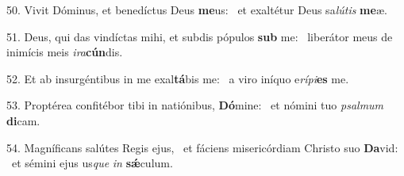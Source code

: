 50. Vivit Dóminus, et benedíctus Deus \textbf{me}us: \ast\  et exaltétur Deus sa\textit{lú}\textit{tis} \textbf{me}æ.\

51. Deus, qui das vindíctas mihi, et subdis pópulos \textbf{sub} me: \ast\  liberátor meus de inimícis meis \textit{i}\textit{ra}\textbf{cún}dis.\

52. Et ab insurgéntibus in me exal\textbf{tá}bis me: \ast\  a viro iníquo e\textit{rí}\textit{pi}\textbf{es} me.\

53. Proptérea confitébor tibi in natiónibus, \textbf{Dó}mine: \ast\  et nómini tuo \textit{psal}\textit{mum} \textbf{di}cam.\

54. Magníficans salútes Regis ejus, \dag\  et fáciens misericórdiam Christo suo \textbf{Da}vid: \ast\  et sémini ejus us\textit{que} \textit{in} \textbf{sǽ}culum.\

